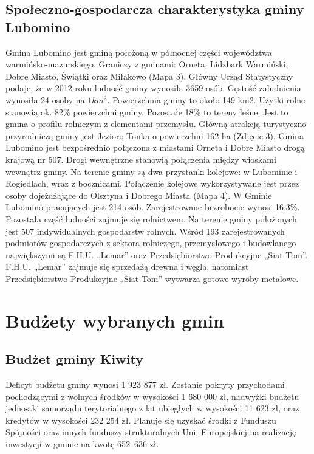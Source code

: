 \documentclass[a4paper,10pt]{article}
\begin{document}
  \subsection{Społeczno-gospodarcza charakterystyka gminy Lubomino}
    Gmina Lubomino jest gminą położoną w północnej części województwa warmińsko-mazurskiego. 
    Graniczy z gminami: Orneta, Lidzbark Warmiński, Dobre Miasto, Świątki oraz Miłakowo (Mapa 3).
    Główny Urząd Statystyczny podaje, że w 2012 roku ludność gminy wynosiła 3659 osób. Gęstość zaludnienia wynosiła 24 osoby na $1 km^{2}$.
    Powierzchnia gminy to około 149 km2. Użytki rolne stanowią ok. 82\% powierzchni gminy. Pozostałe 18\% to tereny leśne. 
    Jest to gmina o profilu rolniczym z elementami przemysłu.
    Główną atrakcją turystyczno-przyrodniczą gminy jest Jezioro Tonka o powierzchni 162 ha (Zdjęcie 3).
    Gmina Lubomino jest bezpośrednio połączona z miastami Orneta i Dobre Miasto drogą krajową nr 507. Drogi wewnętrzne stanowią połączenia między wioskami wewnątrz gminy. 
    Na terenie gminy są dwa przystanki kolejowe: w Lubominie i Rogiedlach, wraz z bocznicami. 
    Połączenie kolejowe wykorzystywane jest przez osoby dojeżdżające do Olsztyna i Dobrego Miasta (Mapa 4). 
    W Gminie Lubomino pracujących jest 214 osób. Zarejestrowane bezrobocie wynosi 16,3\%. 
    Pozostała część ludności zajmuje się rolnictwem. Na terenie gminy położonych jest 507 indywidualnych gospodarstw rolnych.
    Wśród 193 zarejestrowanych podmiotów gospodarczych z sektora rolniczego, przemysłowego i budowlanego największymi są F.H.U. „Lemar” oraz Przedsiębiorstwo Produkcyjne „Siat-Tom”. 
    F.H.U. „Lemar” zajmuje się sprzedażą drewna i węgla, natomiast Przedsiębiorstwo Produkcyjne „Siat-Tom” wytwarza gotowe wyroby metalowe.
    
\newpage
\section{Budżety wybranych gmin}
  \subsection{Budżet gminy Kiwity}
    Deficyt budżetu gminy wynosi 1 923 877 zł. 
    Zostanie pokryty przychodami pochodzącymi z wolnych środków w wysokości 1 680 000 zł, 
    nadwyżki budżetu jednostki samorządu terytorialnego z lat ubiegłych w wysokości 11 623 zł, oraz kredytów w wysokości 232 254 zł.
    Planuje się uzyskać środki z Funduszu Spójności oraz innych funduszy strukturalnych Unii Europejskiej na realizację inwestycji w gminie na kwotę 652 636 zł.
\end{document}
